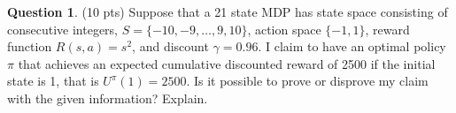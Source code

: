 \documentclass{article}
\theoremstyle{definition}
\newtheorem{question}[thm]{Question}
\begin{document}
\clearpage

\begin{question} (10 pts)
    Suppose that a 21 state MDP has state space consisting of consecutive integers, $S = \{-10, -9, \ldots, 9, 10\}$, action space $\{-1, 1\}$, reward function $R(s, a)=s^2$, and discount $\gamma=0.96$. I claim to have an optimal policy $\pi$ that achieves an expected  cumulative discounted reward of 2500 if the initial state is 1, that is $U^\pi(1) = 2500$. Is it possible to prove or disprove my claim with the given information? Explain.
\end{question}
\end{document}
